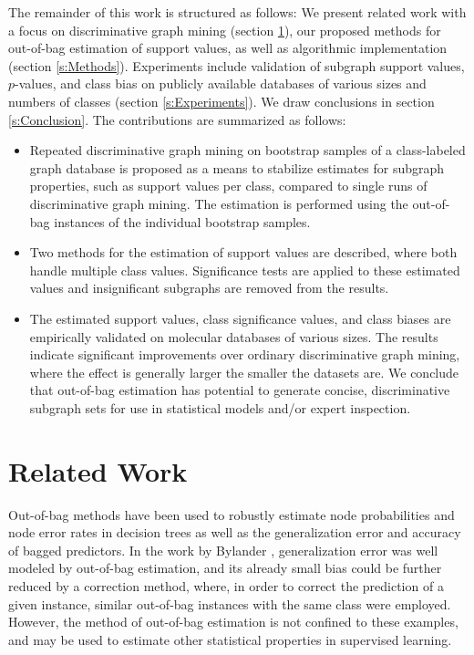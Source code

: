 \documentclass{sig-alternate}
\begin{document}
The remainder of this work is structured as follows: We present related work
with a focus on discriminative graph mining (section \ref{s:relatedWork}), our
proposed methods for out-of-bag estimation of support values, as
well as algorithmic implementation (section \ref{s:Methods}).
Experiments include validation of subgraph support
values, $p$-values, and class bias on publicly available databases of
various sizes and numbers of classes (section \ref{s:Experiments}).
We draw conclusions in section \ref{s:Conclusion}.
The contributions are summarized as follows:
\begin{itemize}
  \item Repeated discriminative graph mining on bootstrap samples of a
    class-labeled graph database is proposed as a means to stabilize estimates
    for subgraph properties, such as support values per class, compared to
    single runs of discriminative graph mining. The estimation is performed
    using the out-of-bag instances of the individual bootstrap samples.
  \item Two methods for the estimation of support values are described, where both
    handle multiple class values. Significance tests are applied to these
    estimated values and insignificant subgraphs are removed from the results. 
  \item The estimated support values, class significance values, and class
    biases are empirically validated on molecular databases of various
    sizes. The results indicate significant improvements over 
    ordinary discriminative graph mining, where the effect is generally larger the
    smaller the datasets are. We conclude that out-of-bag estimation has 
    potential to generate concise, discriminative subgraph sets for
    use in statistical models and/or expert inspection.
\end{itemize}


\section{Related Work}
\label{s:relatedWork}

Out-of-bag methods have been used to robustly estimate node probabilities and
node error rates in decision trees \cite{breiman96oob} as well as the
generalization error and accuracy of bagged predictors. In the work by Bylander
\cite{bylander02estimating}, generalization error was well modeled by
out-of-bag estimation, and its already small bias could be further reduced by a
correction method, where, in order to correct the prediction of a given
instance, similar out-of-bag instances with the same class were
employed. However, the method of out-of-bag estimation is not confined to these
examples, and may be used to estimate other statistical properties in
supervised learning.
\end{document}
